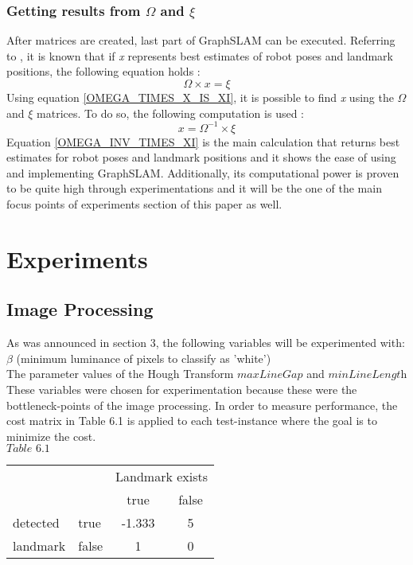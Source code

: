 \documentclass{ba-kecs}
\numberwithin{figure}{section}
\numberwithin{equation}{section}
\begin{document}
\subsubsection{Getting results from $\Omega$ and $\xi$}
	After matrices are created, last part of GraphSLAM can be executed. Referring to \cite{sik2}, it is known that if \textit{x} represents best estimates of robot poses and landmark positions, the following equation holds :
	\begin{equation}
	\Omega \times x = \xi \label{OMEGA_TIMES_X_IS_XI}
	\end{equation}
	Using equation \eqref{OMEGA_TIMES_X_IS_XI}, it is possible to find \textit{x} using the $\Omega$ and $\xi$ matrices. To do so, the following computation is used :
	\begin{equation}
	x = \Omega^{-1} \times \xi \label{OMEGA_INV_TIMES_XI}
	\end{equation}
	Equation \eqref{OMEGA_INV_TIMES_XI} is the main calculation that returns best estimates for robot poses and landmark positions and it shows the ease of using and implementing GraphSLAM. Additionally, its computational power is proven to be quite high through experimentations\cite{sik,sik2} and it will be the one of the main focus points of experiments section of this paper as well.



\section{Experiments}

\subsection{Image Processing}
As was announced in section 3, the following variables will be experimented with: \\
$\beta$ (minimum luminance of pixels to classify as 'white')\\
The parameter values of the Hough Transform $\textit{maxLineGap}$ and $\textit{minLineLength}$ \\
These variables were chosen for experimentation because these were the bottleneck-points of the image processing. 
In order to measure performance, the cost matrix in Table 6.1 is applied to each test-instance where the goal is to minimize the cost. \\

	$\textit{Table 6.1}$ \\
\begin{tabular}{ l l|c|c| }
\multicolumn{1}{r}{} & \multicolumn{1}{r}{} & \multicolumn{2}{c}{Landmark exists} \\
\multicolumn{1}{r}{} & \multicolumn{1}{r}{}
 &  \multicolumn{1}{c}{{\small true}}
 & \multicolumn{1}{c}{{\small false}} \\
\cline{3-4}
detected & {\small true} & -1.333 & 5 \\
\cline{3-4}
landmark & {\small false} & 1 & 0 \\
\cline{3-4}
\end{tabular} \\
\end{document}
